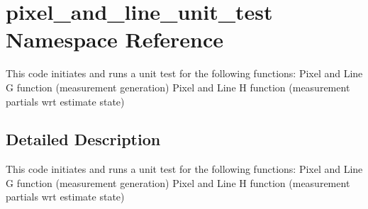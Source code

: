 \hypertarget{namespacepixel__and__line__unit__test}{}\section{pixel\+\_\+and\+\_\+line\+\_\+unit\+\_\+test Namespace Reference}
\label{namespacepixel__and__line__unit__test}


This code initiates and runs a unit test for the following functions\+: Pixel and Line G function (measurement generation) Pixel and Line H function (measurement partials wrt estimate state)  




\subsection{Detailed Description}
This code initiates and runs a unit test for the following functions\+: Pixel and Line G function (measurement generation) Pixel and Line H function (measurement partials wrt estimate state) 